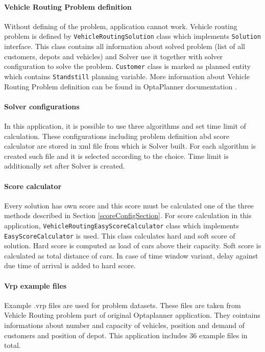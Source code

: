 \paragraph{Vehicle Routing Problem definition}
Without defining of the problem, application cannot work. Vehicle routing problem is defined by
\texttt{VehicleRoutingSolution} class which implements \texttt{Solution} interface. This class contains all information
about solved problem (list of all customers, depots and vehicles) and Solver use it together with solver configuration
to solve the problem. \texttt{Customer} class is marked as planned entity which contains \texttt{Standstill} planning
variable. More information about Vehicle Routing Problem definition can be found in OptaPlanner documentation
\cite{OptaPlannerDoc}.

\paragraph{Solver configurations}
In this application, it is possible to use three algorithms and set time limit of calculation. These configurations
including problem definition abd score calculator are stored in xml file from which is Solver built. For each algorithm
is created such file and it is selected according to the choice. Time limit is additionally set after Solver is created.

\paragraph{Score calculator}
Every solution has own score and this score must be calculated one of the three methods described in Section
\ref{scoreConfigSection}. For score calculation in this application, \texttt{VehicleRoutingEasyScoreCalculator} class
which implements \texttt{EasyScoreCalculator} is used. This class calculates hard and soft score of solution. Hard score
is computed as load of cars above their capacity. Soft score is calculated as total distance of cars. In case of time
window variant, delay against due time of arrival is added to hard score.

\paragraph{Vrp example files}
Example .vrp files are used for problem datasets. These files are taken from Vehicle Routing problem part of original
Optaplanner application. They cointains informations about number and capacity of vehicles, position and demand of
customers and position of depot. This application includes 36 example files in total.

